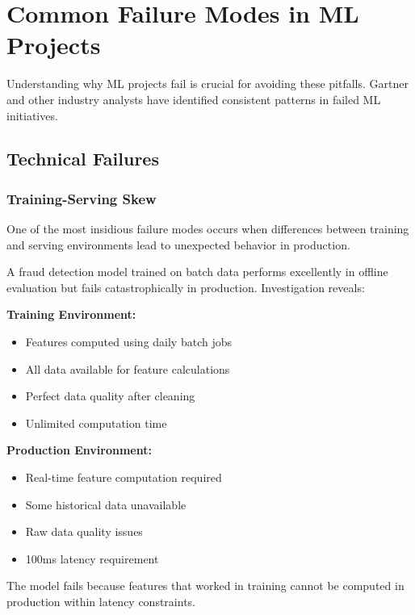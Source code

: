\section{Common Failure Modes in ML Projects}

Understanding why ML projects fail is crucial for avoiding these pitfalls. Gartner and other industry analysts have identified consistent patterns in failed ML initiatives.

\subsection{Technical Failures}

\subsubsection{Training-Serving Skew}

One of the most insidious failure modes occurs when differences between training and serving environments lead to unexpected behavior in production.

\begin{example}
A fraud detection model trained on batch data performs excellently in offline evaluation but fails catastrophically in production. Investigation reveals:

\textbf{Training Environment:}
\begin{itemize}
    \item Features computed using daily batch jobs
    \item All data available for feature calculations
    \item Perfect data quality after cleaning
    \item Unlimited computation time
\end{itemize}

\textbf{Production Environment:}
\begin{itemize}
    \item Real-time feature computation required
    \item Some historical data unavailable
    \item Raw data quality issues
    \item 100ms latency requirement
\end{itemize}

The model fails because features that worked in training cannot be computed in production within latency constraints.
\end{example}

